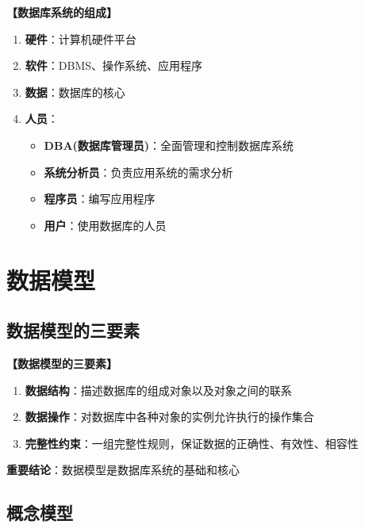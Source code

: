 \documentclass[12pt, a4paper]{article}
\newenvironment{bluebox}[1]{%
  \begin{trivlist}
  \item[\hskip\labelsep \textbf{#1}]
  \setlength{\parskip}{0.5ex}
  \setlength{\itemsep}{0.5ex}
}{%
  \end{trivlist}
}
\begin{document}
\begin{bluebox}{系统组成}
	\textbf{【数据库系统的组成】}

	\begin{enumerate}[leftmargin=*, label=\textbf{\arabic*.}]
		\item \textbf{硬件}：计算机硬件平台
		\item \textbf{软件}：DBMS、操作系统、应用程序
		\item \textbf{数据}：数据库的核心
		\item \textbf{人员}：
		      \begin{itemize}
			      \item \textbf{DBA(数据库管理员)}：全面管理和控制数据库系统
			      \item \textbf{系统分析员}：负责应用系统的需求分析
			      \item \textbf{程序员}：编写应用程序
			      \item \textbf{用户}：使用数据库的人员
		      \end{itemize}
	\end{enumerate}
\end{bluebox}

\section{数据模型}

\subsection{数据模型的三要素}

\begin{bluebox}{三要素}
	\textbf{【数据模型的三要素】}

	\begin{enumerate}[leftmargin=*, label=\textbf{\arabic*.}]
		\item \textbf{数据结构}：描述数据库的组成对象以及对象之间的联系
		\item \textbf{数据操作}：对数据库中各种对象的实例允许执行的操作集合
		\item \textbf{完整性约束}：一组完整性规则，保证数据的正确性、有效性、相容性
	\end{enumerate}

	\textbf{重要结论}：数据模型是数据库系统的基础和核心
\end{bluebox}

\subsection{概念模型}
\end{document}
